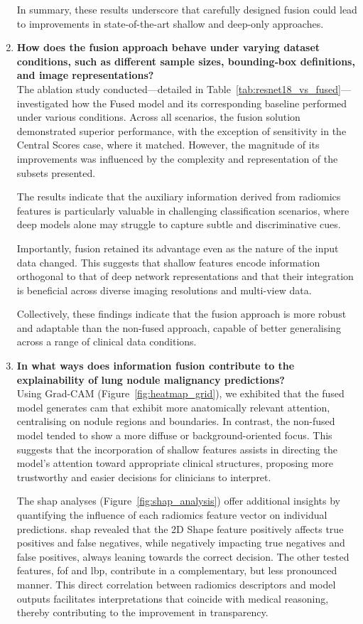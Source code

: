 \begin{enumerate}
In summary, these results underscore that carefully designed fusion could lead to improvements in state-of-the-art shallow and deep-only approaches.

  
  \item \textbf{How does the fusion approach behave under varying dataset conditions, such as different sample sizes, bounding‐box definitions, and image representations?}\\
The ablation study conducted—detailed in Table~\ref{tab:resnet18_vs_fused}—investigated how the Fused model and its corresponding baseline performed under various conditions. Across all scenarios, the fusion solution demonstrated superior performance, with the exception of sensitivity in the Central Scores case, where it matched. However, the magnitude of its improvements was influenced by the complexity and representation of the subsets presented.

The results indicate that the auxiliary information derived from radiomics features is particularly valuable in challenging classification scenarios, where deep models alone may struggle to capture subtle and discriminative cues.

Importantly, fusion retained its advantage even as the nature of the input data changed. This suggests that shallow features encode information orthogonal to that of deep network representations and that their integration is beneficial across diverse imaging resolutions and multi-view data. 

Collectively, these findings indicate that the fusion approach is more robust and adaptable than the non-fused approach, capable of better generalising across a range of clinical data conditions.
  
  \item \textbf{In what ways does information fusion contribute to the explainability of lung nodule malignancy predictions?}\\
Using Grad-CAM (Figure~\ref{fig:heatmap_grid}), we exhibited that the fused model generates \ac{cam} that exhibit more anatomically relevant attention, centralising on nodule regions and boundaries. In contrast, the non-fused model tended to show a more diffuse or background-oriented focus. This suggests that the incorporation of shallow features assists in directing the model's attention toward appropriate clinical structures, proposing more trustworthy and easier decisions for clinicians to interpret.

The \ac{shap} analyses (Figure~\ref{fig:shap_analysis}) offer additional insights by quantifying the influence of each radiomics feature vector on individual predictions. \ac{shap} revealed that the 2D Shape feature positively affects true positives and false negatives, while negatively impacting true negatives and false positives, always leaning towards the correct decision. The other tested features, \ac{fof} and \ac{lbp}, contribute in a complementary, but less pronounced manner.
This direct correlation between radiomics descriptors and model outputs facilitates interpretations that coincide with medical reasoning, thereby contributing to the improvement in transparency.


\end{enumerate}
